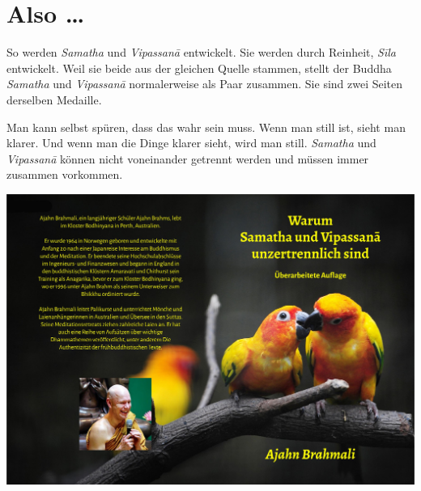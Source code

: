 \documentclass[12pt,openany]{book}
\begin{document}
\chapter*{Also …}

So werden \textit{Samatha} und \textit{Vipas\-sanā} entwickelt. Sie werden durch Reinheit, \textit{Sīla} entwickelt. Weil sie beide aus der gleichen Quelle stammen, stellt der Buddha \textit{Samatha} und \textit{Vipas\-sanā} normalerweise als Paar zusammen. Sie sind zwei Seiten derselben Medaille.

Man kann selbst spüren, dass das wahr sein muss. Wenn man still ist, sieht man klarer. Und wenn man die Dinge klarer sieht, wird man still. \textit{Samatha} und \textit{Vipas\-sanā} können nicht voneinander getrennt werden und müssen immer zusammen vorkommen.

\newpage
\pagestyle{empty}
\mbox

\newpage


\hspace*{-7mm}
\includegraphics{sv-2_a5_cover_de-new}
\end{document}
